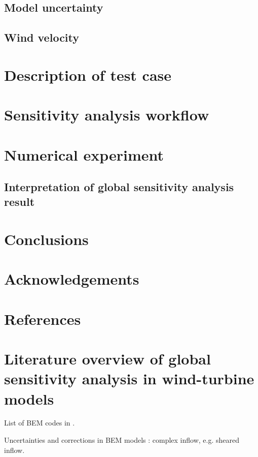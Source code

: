 \documentclass[review]{elsarticle}
\numberwithin{equation}{section}
\newcommand{\myreferences}{./Bibliography/references,./Bibliography/Mendeley_refs}
\numberwithin{equation}{section}
\begin{document}
\subsection{Model uncertainty}
\subsection{Wind velocity}

\section{Description of test case}

\section{Sensitivity analysis workflow}

\section{Numerical experiment}
\subsection{Interpretation of global sensitivity analysis result}

\section{Conclusions}

\section*{Acknowledgements}

\newpage

\section{References}


\newpage

\appendix
\section{Literature overview of global sensitivity analysis in wind-turbine models}
List of BEM codes in \cite{Sayed2019,Vorpahl2013}.

Uncertainties and corrections in BEM models \cite{Madsen2012}: complex inflow, e.g. sheared inflow.
\end{document}

